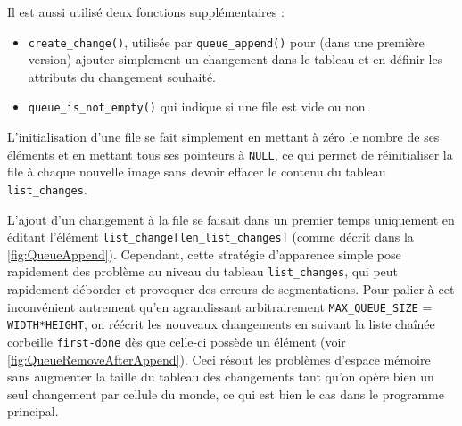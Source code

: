 Il est aussi utilisé deux fonctions supplémentaires :
\begin{itemize}
    \item \lstinline{create_change()}, utilisée par \lstinline{queue_append()} pour (dans une première version) ajouter simplement un changement dans le tableau et en définir les attributs du changement souhaité.
    \item \lstinline{queue_is_not_empty()} qui indique si une file est vide ou non.
\end{itemize}

L'initialisation d'une file se fait simplement en mettant à zéro le nombre de ses éléments et en mettant tous ses pointeurs à \lstinline{NULL}, ce qui permet de réinitialiser la file à chaque nouvelle image sans devoir effacer le contenu du tableau \lstinline{list_changes}. 

L'ajout d'un changement à la file se faisait dans un premier temps uniquement en éditant l'élément \lstinline{list_change[len_list_changes]} (comme décrit dans la \autoref{fig:QueueAppend}). Cependant, cette stratégie d'apparence simple pose rapidement des problème au niveau du tableau \lstinline{list_changes}, qui peut rapidement déborder et provoquer des erreurs de segmentations. Pour palier à cet inconvénient autrement qu'en agrandissant arbitrairement \lstinline{MAX_QUEUE_SIZE} = \lstinline{WIDTH*HEIGHT}, on réécrit les nouveaux changements en suivant la liste chaînée \og corbeille \fg{} \lstinline{first-done} dès que celle-ci possède un élément (voir \autoref{fig:QueueRemoveAfterAppend}). Ceci résout les problèmes d'espace mémoire sans augmenter la taille du tableau des changements tant qu'on opère bien un seul changement par cellule du monde, ce qui est bien le cas dans le programme principal.

